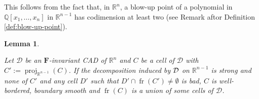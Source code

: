 \documentclass[
]{book}
\newtheorem{lemma}{Lemma}[chapter]
\theoremstyle{definition}
\theoremstyle{definition}
\theoremstyle{definition}
\theoremstyle{definition}
\theoremstyle{remark}
\begin{document}
This follows from the fact that, in \(\mathbb{R}^n\), a blow-up point of a polynomial in \(\mathbb{Q}[x_1,\ldots,x_n]\) in \(\mathbb{R}^{n-1}\) has codimension at least two (see Remark aftor Definition \ref{def:blow-up-point}).

\begin{lemma}
\protect\hypertarget{lem:no-blow-up}{}\label{lem:no-blow-up}\citep[Theorem 4.4]{lazard10}

Let \(\mathcal{D}\) be an \(\mathbf{F}\)-invariant CAD of \(\mathbb{R}^n\) and \(C\) be a cell of \(\mathcal{D}\) with \(C' := \operatorname{proj}_{\mathbb{R}^{n-1}}(C)\). If the decomposition induced by \(\cal D\) on \(\mathbb{R}^{n-1}\) is strong and none of \(C'\) and any cell \(D'\) such that \(D' \cap {\operatorname{fr} \left( C' \right)} \ne \emptyset\) is bad, \(C\) is well-bordered, boundary smooth and \({\operatorname{fr} \left( C \right)}\) is a union of some cells of \(\mathcal{D}\).
\end{lemma}
\end{document}

